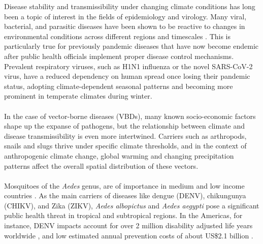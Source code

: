 \documentclass[10pt,twocolumn]{wlscirep}
\begin{document}
Disease stability and transmissibility under changing climate conditions has long been a topic of interest in the fields of epidemiology and virology. Many viral, bacterial, and parasitic diseases have been shown to be reactive to changes in environmental conditions across different regions and timescales \cite{thomson_2008, malloy_2019}. This is particularly true for previously pandemic diseases that have now become endemic after public health officials implement proper disease control mechanisms\cite{li_2019}. Prevalent respiratory viruses, such as H1N1 influenza or the novel SARS-CoV-2 virus, have a reduced dependency on human spread once losing their pandemic status, adopting climate-dependent seasonal patterns and becoming more prominent in temperate climates during winter\cite{shaman_2011, romerostarke_2021}.
\\
\\
In the case of vector-borne diseases (VBDs), many known socio-economic factors shape up the expanse of pathogens\cite{lippi_2018, ibarra_2013, stewart-ibarra_2014}, but the relationship between climate and disease transmissibility is even more intertwined. Carriers such as arthropods, snails and slugs thrive under specific climate thresholds, and in the context of anthropogenic climate change, global warming and changing precipitation patterns affect the overall spatial distribution of these vectors\cite{lowe_2018, messina_2016}.
\\
\\
Mosquitoes of the \textit{Aedes} genus, are of importance in medium and low income countries \cite{campbell-lendrum_2015}. As the main carriers of diseases like dengue (DENV), chikungunya (CHIKV), and Zika (ZIKV), \textit{Aedes albopictus} and \textit{Aedes aegypti} pose a significant public health threat in tropical and subtropical regions\cite{OMS_2020}. In the Americas, for instance, DENV impacts account for over 2 million disability adjusted life years worldwide \cite{yang_2021}, and low estimated annual prevention costs of about US\$2.1 billion \cite{shepard_2011}.
\\
\\
\end{document}
